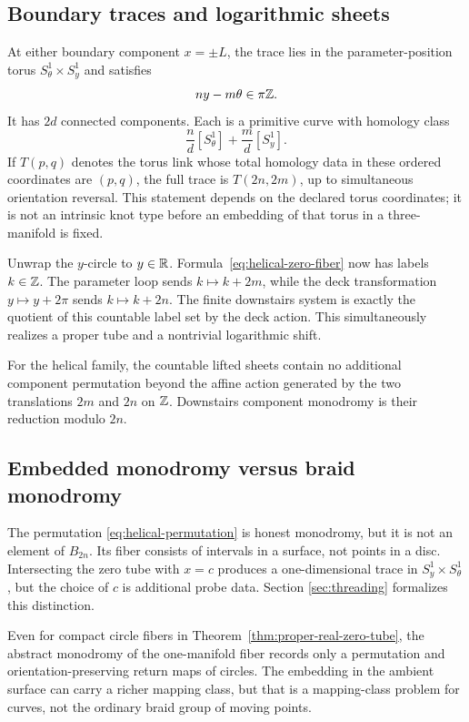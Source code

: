 \subsection{Boundary traces and logarithmic sheets}

At either boundary component $x=\pm L$, the trace lies in the parameter-position
torus $S^1_\theta\times S^1_y$ and satisfies
\[
 ny-m\theta\in\pi\mathbb{Z}.
\]
It has $2d$ connected components.  Each is a primitive curve with homology class
\begin{equation}
 \frac nd[S^1_\theta]+\frac md[S^1_y].
 \label{eq:helical-boundary-class}
\end{equation}
If $T(p,q)$ denotes the torus link whose total homology data in these ordered
coordinates are $(p,q)$, the full trace is $T(2n,2m)$, up to simultaneous
orientation reversal.  This statement depends on the declared torus coordinates;
it is not an intrinsic knot type before an embedding of that torus in a
three-manifold is fixed.

Unwrap the $y$-circle to $y\in\mathbb{R}$.  Formula~\eqref{eq:helical-zero-fiber} now has
labels $k\in\mathbb{Z}$.  The parameter loop sends $k\mapsto k+2m$, while the deck
transformation $y\mapsto y+2\pi$ sends $k\mapsto k+2n$.  The finite downstairs
system is exactly the quotient of this countable label set by the deck action.
This simultaneously realizes a proper tube and a nontrivial logarithmic shift.

\begin{corollary}
\label{cor:helical-finite-quotient}
For the helical family, the countable lifted sheets contain no additional
component permutation beyond the affine action generated by the two translations
$2m$ and $2n$ on $\mathbb{Z}$.  Downstairs component monodromy is their reduction modulo
$2n$.
\end{corollary}

\subsection{Embedded monodromy versus braid monodromy}

The permutation \eqref{eq:helical-permutation} is honest monodromy, but it is not
an element of $B_{2n}$.  Its fiber consists of intervals in a surface, not points in
a disc.  Intersecting the zero tube with $x=c$ produces a one-dimensional trace in
$S^1_y\times S^1_\theta$, but the choice of $c$ is additional probe data.  Section
\ref{sec:threading} formalizes this distinction.

Even for compact circle fibers in Theorem~\ref{thm:proper-real-zero-tube}, the
abstract monodromy of the one-manifold fiber records only a permutation and
orientation-preserving return maps of circles.  The embedding in the ambient
surface can carry a richer mapping class, but that is a mapping-class problem for
curves, not the ordinary braid group of moving points.
